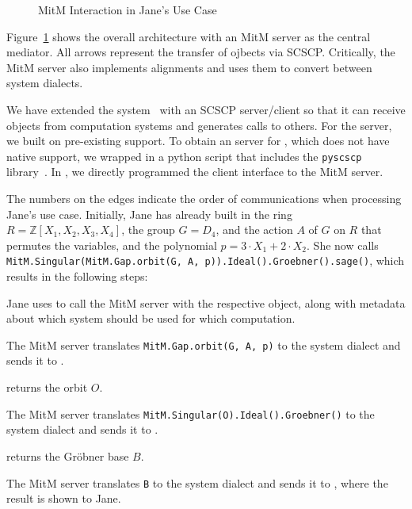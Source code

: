 \begin{figure}[ht]\centering
  \caption{MitM Interaction in Jane's Use Case}\label{fig:mitmpoc}
\end{figure}

Figure~\ref{fig:mitmpoc} shows the overall architecture with an MitM server as the central mediator.
All arrows represent the transfer of \OMMT ojbects via SCSCP.
Critically, the MitM server also implements alignments and uses them to convert between system dialects.

We have extended the \MMT system~\cite{Rabe:MAGMS13} with an SCSCP server/client so that it can receive objects from computation systems and generates calls to others.
For the \GAP server, we built on pre-existing \SCSCP support.
To obtain an \SCSCP server for \Singular, which does not have native \SCSCP support, we wrapped \Singular in a python script that includes the \lstinline|pyscscp| library~\cite{py-scscp:on}.
In \Sage, we directly programmed the client interface to the MitM server.

The numbers on the edges indicate the order of communications when processing Jane's use case.
Initially, Jane has already built in \Sage the ring $R=\mathbb{Z}[X_1,X_2,X_3,X_4]$, the group $G=D_4$, and the action $A$ of $G$ on $R$ that permutes the variables, and the polynomial $p = 3\cdot X_1 + 2\cdot X_2$.
She now calls \lstinline|MitM.Singular(MitM.Gap.orbit(G, A, p)).Ideal().Groebner().sage()|, which results in the following steps:
\begin{compactenum}
  \item Jane uses \Sage to call the MitM server with the respective \Sage object, along with metadata about which system should be used for which computation.
  \item The MitM server translates \lstinline|MitM.Gap.orbit(G, A, p)| to the \GAP system dialect and sends it to \GAP.
  \item \GAP returns the orbit $O$.
  \item The MitM server translates \lstinline|MitM.Singular(O).Ideal().Groebner()| to the \Singular system dialect and sends it to \Singular.
  \item \Singular returns the Gröbner base $B$.
  \item The MitM server translates \lstinline|B| to the \Sage system dialect and sends it to \Sage, where the result is shown to Jane.
\end{compactenum}


